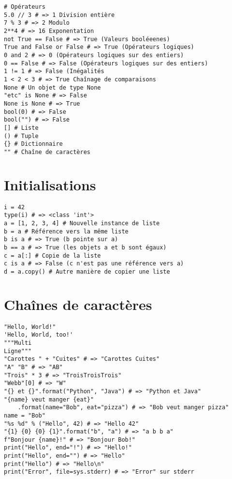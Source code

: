 \documentclass{article}
\begin{document}
\begin{multicols*}{3}
\begin{lstlisting}
# Opérateurs 
5.0 // 3 # => 1 Division entière
7 % 3 # => 2 Modulo
2**4 # => 16 Exponentation
not True == False # => True (Valeurs booléeenes)
True and False or False # => True (Opérateurs logiques)
0 and 2 # => 0 (Opérateurs logiques sur des entiers)
0 == False # => False (Opérateurs logiques sur des entiers)
1 != 1 # => False (Inégalités
1 < 2 < 3 # => True Chaînage de comparaisons
None # Un objet de type None
"etc" is None # => False
None is None # => True
bool(0) # => False
bool("") # => False
[] # Liste 
() # Tuple 
{} # Dictionnaire
"" # Chaîne de caractères
\end{lstlisting}

\section*{Initialisations}

\begin{lstlisting}
i = 42
type(i) # => <class 'int'>
a = [1, 2, 3, 4] # Nouvelle instance de liste 
b = a # Référence vers la même liste
b is a # => True (b pointe sur a)
b == a # => True (les objets a et b sont égaux)
c = a[:] # Copie de la liste
c is a # => False (c n'est pas une référence vers a)
d = a.copy() # Autre manière de copier une liste
\end{lstlisting}

\section*{Chaînes de caractères}

\begin{lstlisting}
"Hello, World!"
'Hello, World, too!'
"""Multi 
Ligne"""
"Carottes " + "Cuites" # => "Carottes Cuites"
"A" "B" # => "AB"
"Trois" * 3 # => "TroisTroisTrois"
"Webb"[0] # => "W"
"{} et {}".format("Python", "Java") # => "Python et Java"
"{name} veut manger {eat}"
    .format(name="Bob", eat="pizza") # => "Bob veut manger pizza"
name = "Bob"
"%s %d" % ("Hello", 42) # => "Hello 42"
"{1} {0} {0} {1}".format("b", "a") # => "a b b a"
f"Bonjour {name}!" # => "Bonjour Bob!"
print("Hello", end="!") # => "Hello!"
print("Hello", end="") # => "Hello"
print("Hello") # => "Hello\n"
print("Error", file=sys.stderr) # => "Error" sur stderr 
\end{lstlisting}


\end{multicols*}
\end{document}
